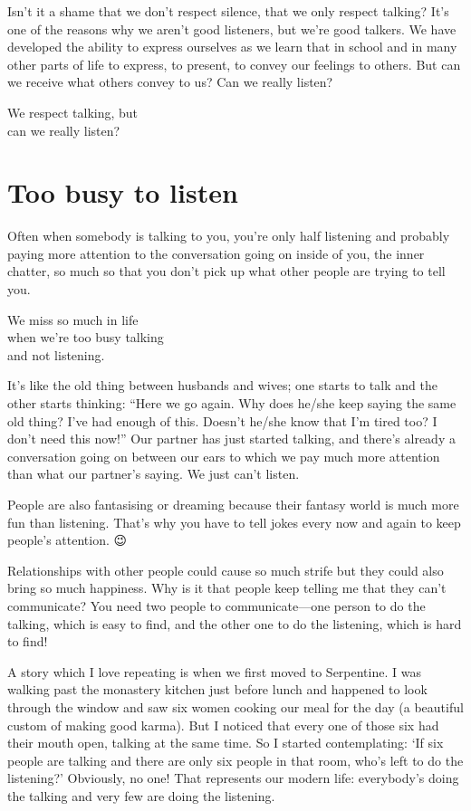 \documentclass[12pt, openany]{book}
\newenvironment{aphorism}%
{%
\begin{center}\begin{itshape}
}%
{\end{itshape}\end{center}
}%
\begin{document}
Isn’t it a shame that we don’t respect silence, that we only respect talking? It’s one of the reasons why we aren’t good listeners, but we’re good talkers. We have developed the ability to express ourselves as we learn that in school and in many other parts of life to express, to present, to convey our feelings to others. But can we receive what others convey to us? Can we really listen? 

\begin{aphorism}
We respect talking, but\\  
can we really listen?
\end{aphorism}

\section*{Too busy to listen}

Often when somebody is talking to you, you’re only half listening and probably paying more attention to the conversation going on inside of you, the inner chatter, so much so that you don’t pick up what other people are trying to tell you. 

\begin{aphorism}
We miss so much in life\\  
when we’re too busy talking\\ 
and not listening.
\end{aphorism}

It’s like the old thing between husbands and wives; one starts to talk and the other starts thinking: “Here we go again. Why does he/she keep saying the same old thing? I’ve had enough of this. Doesn’t he/she know that I’m tired too? I don’t need this now!” Our partner has just started talking, and there’s already a conversation going on between our ears to which we pay much more attention than what our partner’s saying. We just can’t listen. 

People are also fantasising or dreaming because their fantasy world is much more fun than listening. That’s why you have to tell jokes every now and again to keep people’s attention. 😉

Relationships with other people could cause so much strife but they could also bring so much happiness. Why is it that people keep telling me that they can’t communicate? You need two people to communicate—one person to do the talking, which is easy to find, and the other one to do the listening, which is hard to find! 

A story which I love repeating is when we first moved to Serpentine. I was walking past the monastery kitchen just before lunch and happened to look through the window and saw six women cooking our meal for the day (a beautiful custom of making good karma). But I noticed that every one of those six had their mouth open, talking at the same time. So I started contemplating: ‘If six people are talking and there are only six people in that room, who’s left to do the listening?’ Obviously, no one! That represents our modern life: everybody’s doing the talking and very few are doing the listening. 
\end{document}
